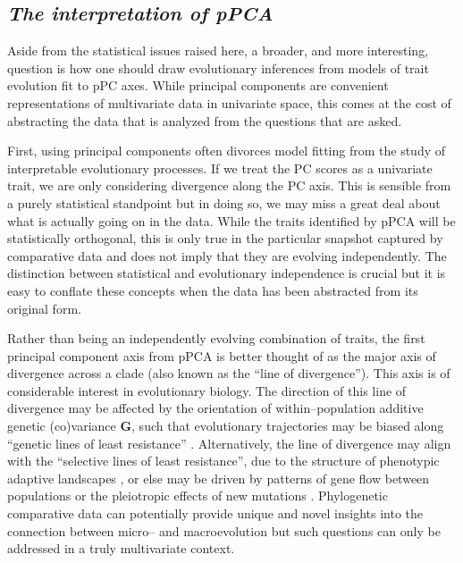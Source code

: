 \documentclass[a4paper,12pt]{article}
\begin{document}
\subsection{\emph{The interpretation of pPCA}}

Aside from the statistical issues raised here, a broader, and more interesting, question is how one should draw evolutionary inferences from models of trait evolution fit to pPC axes. While principal components are convenient representations of multivariate data in univariate space, this comes at the cost of abstracting the data that is analyzed from the questions that are asked. 

First, using principal components often divorces model fitting from the study of interpretable evolutionary processes. If we treat the PC scores as a univariate trait, we are only considering divergence along the PC axis. This is sensible from a purely statistical standpoint but in doing so, we may miss a great deal about what is actually going on in the data. While the traits identified by pPCA will be statistically orthogonal, this is only true in the particular snapshot captured by comparative data and does not imply that they are evolving independently. The distinction between statistical and evolutionary independence is crucial \citep{HansenHoule2008} but it is easy to conflate these concepts when the data has been abstracted from its original form. 

Rather than being an independently evolving combination of traits, the first principal component axis from pPCA is better thought of as the major axis of divergence across a clade (also known as the ``line of divergence''). This axis is of considerable interest in evolutionary biology. The direction of this line of divergence may be affected by the orientation of within--population additive genetic (co)variance $\mathbf{G}$, such that evolutionary trajectories may be biased along ``genetic lines of least resistance'' \citep[i.e., divergence occurs primarily along the leading eigenvector of $\mathbf{G}$, $G_{\text{max}}$;][]{Schluter1996}. Alternatively, the line of divergence may align with the ``selective lines of least resistance'', due to the structure of phenotypic adaptive landscapes \citep{Jonesetal2007, Arnoldetal2008}, or else may be driven by patterns of gene flow between populations \citep{Guillaume2007} or the pleiotropic effects of new mutations \citep{Jonesetal2007, Hether2013}. Phylogenetic comparative data can potentially provide unique and novel insights into the connection between micro-- and macroevolution \citep{Hohenlohe2008} but such questions can only be addressed in a truly multivariate context. 
\end{document}
